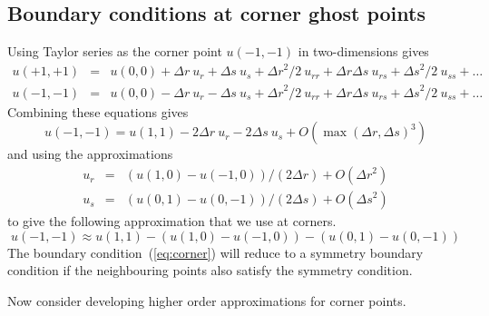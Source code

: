 \subsection{Boundary conditions at corner ghost points}
\newcommand{\dr}{{\Delta r}}
\newcommand{\ds}{{\Delta s}}


Using Taylor series as the corner point $u(-1,-1)$ in two-dimensions gives
\begin{eqnarray*}
  u(+1,+1) &=& u(0,0) +\dr~u_r + \ds~u_s + \dr^2/2~ u_{rr} + \dr \ds~ u_{rs} + \ds^2/2~ u_{ss} + \ldots \\
  u(-1,-1) &=& u(0,0) -\dr~u_r - \ds~u_s + \dr^2/2~ u_{rr} + \dr \ds~ u_{rs} + \ds^2/2~ u_{ss} + \ldots 
\end{eqnarray*}
Combining these equations gives
\[
  u(-1,-1) = u(1,1) -2 \dr~u_r -2 \ds~u_s + O(\max(\dr,\ds)^3)
\]
and using the approximations
\begin{eqnarray*}
  u_r &=& (u(1,0)-u(-1,0))/(2 \dr) + O(\dr^2) \\
  u_s &=& (u(0,1)-u(0,-1))/(2 \ds) + O(\ds^2)
\end{eqnarray*}
to give the following approximation that we use at corners.
\begin{equation}
   u(-1,-1) \approx u(1,1) -( u(1,0)-u(-1,0) ) - (u(0,1)-u(0,-1)) \label{eq:corner}
\end{equation}
The boundary condition~(\ref{eq:corner}) will reduce to a symmetry boundary condition
if the neighbouring points also satisfy the symmetry condition.



Now consider developing higher order approximations for corner points.

\newcommand{\ra}{{r_1}}
\newcommand{\rb}{{r_2}}
\newcommand{\rc}{{r_3}}
\newcommand{\dra}{{\Delta r_1}}
\newcommand{\drb}{{\Delta r_2}}
\newcommand{\drc}{{\Delta r_3}}
\newcommand{\trunc}{O(|\rv|^6)}
\newcommand{\Ds}{{\cal D}}

